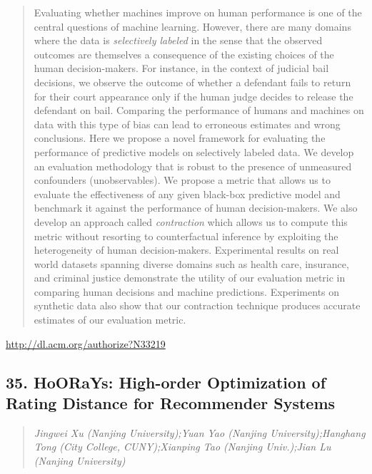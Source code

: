 \documentclass{article}
\begin{document}
\begin{quote}
Evaluating whether machines improve on human performance is one of the central questions of machine learning. However, there are many domains where the data is {\em selectively labeled} in the sense that the observed outcomes are themselves a consequence of the existing choices of the human decision-makers. For instance, in the context of judicial bail decisions, we observe the outcome of whether a defendant fails to return for their court appearance only if the human judge decides to release the defendant on bail. Comparing the performance of humans and machines on data with this type of bias can lead to erroneous estimates and wrong conclusions. Here we propose a novel framework for evaluating the performance of predictive models on selectively labeled data. We develop an evaluation methodology that is robust to the presence of unmeasured confounders (unobservables). We propose a metric that allows us to evaluate the effectiveness of any given black-box predictive model and benchmark it against the performance of human decision-makers. We also develop an approach called \emph{contraction} which allows us to compute this metric without resorting to counterfactual inference by exploiting the heterogeneity of human decision-makers. Experimental results on real world datasets spanning diverse domains such as health care, insurance, and criminal justice demonstrate the utility of our evaluation metric in comparing human decisions and machine predictions. Experiments on synthetic data also show that our contraction technique produces accurate estimates of our evaluation metric.
\end{quote}

\href{http://dl.acm.org/authorize?N33219}{http://dl.acm.org/authorize?N33219}

\subsection{35. HoORaYs: High-order Optimization of Rating Distance for Recommender Systems}

\begin{quote}
\footnotesize{\textit{Jingwei Xu (Nanjing University);Yuan Yao (Nanjing University);Hanghang Tong (City College, CUNY);Xianping Tao (Nanjing Univ.);Jian Lu (Nanjing University)}}

\end{quote}
\end{document}
